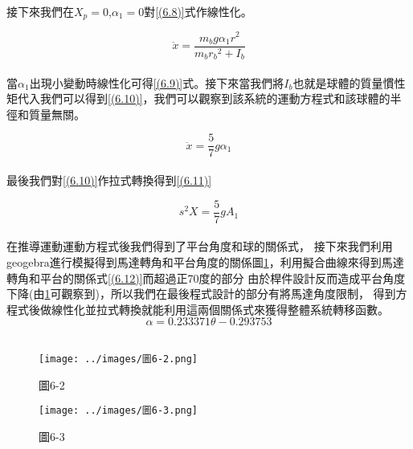 接下來我們在\(X_p=0\),\(\alpha_1=0\)對\ref{(6.8)}式作線性化。

\begin{equation}
\ddot{x}=\frac{m_b g \alpha_1 r^2}{m_b r_b{ }^2+I_b}
\label{(6.9)}
\end{equation}\\

當\(\alpha_1\)出現小變動時線性化可得\ref{(6.9)}式。接下來當我們將\(I_b\)也就是球體的質量慣性矩代入我們可以得到\ref{(6.10)}，我們可以觀察到該系統的運動方程式和該球體的半徑和質量無關。

\begin{equation}
\ddot{x}=\frac{5}{7} g \alpha_1
\label{(6.10)}
\end{equation}\\

最後我們對\ref{(6.10)}作拉式轉換得到\ref{(6.11)}

\begin{equation}
s^2 X=\frac{5}{7} g A_1
\label{(6.11)}
\end{equation}\\

在推導運動運動方程式後我們得到了平台角度和球的關係式，
接下來我們利用geogebra進行模擬得到馬達轉角和平台角度的關係圖\ref{圖6-2}，利用擬合曲線來得到馬達轉角和平台的關係式\ref{(6.12)}而超過正70度的部分
由於桿件設計反而造成平台角度下降(由\ref{圖6-2}可觀察到)，所以我們在最後程式設計的部分有將馬達角度限制，
得到方程式後做線性化並拉式轉換就能利用這兩個關係式來獲得整體系統轉移函數。\\

\begin{equation}
\alpha=0.233371\theta-0.293753
\label{(6.12)}
\end{equation}\\

\begin{figure}[h]
\centering
\texttt{[image: ../images/圖6-2.png]}
\caption{圖6-2}
\label{圖6-2}
\end{figure}

\begin{figure}[h]
\centering
\texttt{[image: ../images/圖6-3.png]}
\caption{圖6-3}
\label{圖6-3}
\end{figure}